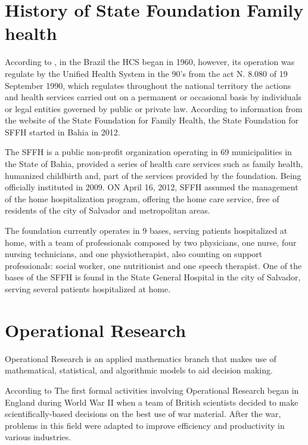 
\section{History of State Foundation Family health}

According to \cite{Silva:2010}, in the Brazil the \ac{HCS} began in 1960, however, its operation was regulate by the Unified Health System in the 90's from the act N. 8.080 of 19 September 1990, which regulates throughout the national territory the actions and health services carried out on a permanent or occasional basis by individuals or legal entities governed by public or private law. According to information from the website of the State Foundation for Family Health, the State Foundation for \ac{SFFH} started in Bahia in 2012.    

The \ac{SFFH} is a public non-profit organization operating in 69 municipalities in the State of Bahia, provided a series of health care services such as family health, humanized childbirth and, part of the services provided by the foundation. Being officially instituted in 2009.
ON April 16, 2012, \ac{SFFH} assumed the management of the home hospitalization program, offering the home care service, free of residents of the city of Salvador and metropolitan areas.
 
The foundation currently operates in 9 bases, serving patients hospitalized at home, with a team of professionals composed by two physicians, one nurse, four nursing technicians, and one physiotherapist, also counting on support professionals: social worker, one nutritionist and one speech therapist.
One of the bases of the \ac{SFFH} is found in the State General Hospital in the city of Salvador, serving several patients hospitalized at home.

\section{Operational Research}

Operational Research is an applied mathematics branch that makes use of mathematical, statistical, and algorithmic models to aid decision making. 

According to  The first formal activities involving Operational Research began in England during World War II when a team of British scientists decided to make scientifically-based decisions on the best use of war material.
After the war, problems in this field were adapted to improve efficiency and productivity in various industries.

